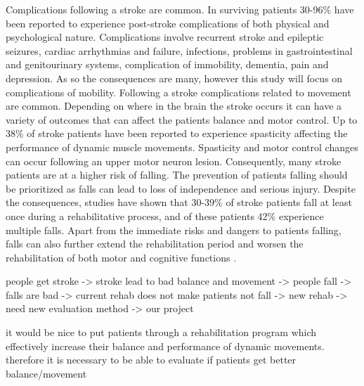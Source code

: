 Complications following a stroke are common. In surviving patients 30-96\% have been reported to experience post-stroke complications of both physical and psychological nature. Complications involve recurrent stroke and epileptic seizures, cardiac arrhythmias and failure, infections, problems in gastrointestinal and genitourinary systems, complication of immobility, dementia, pain and depression.  \cite{Bhalla2016} %
As so the consequences are many, however this study will focus on complications of mobility. Following a stroke complications related to movement are common. Depending on where in the brain the stroke occurs it can have a variety of outcomes that can affect the patients balance and motor control. Up to 38\% of stroke patients have been reported to experience spasticity affecting the performance of dynamic muscle movements. Spasticity and motor control changes can occur following an upper motor neuron lesion. \cite{Bhalla2016} %
Consequently, many stroke patients are at a higher risk of falling. %
The prevention of patients falling should be prioritized as falls can lead to loss of independence and serious injury. Despite the consequences, studies have shown that 30-39\% of stroke patients fall at least once during a rehabilitative process, and of these patients 42\% experience multiple falls. \cite{Bhalla2016, Hanger2014} Apart from the immediate risks and dangers to patients falling, falls can also further extend the rehabilitation period and worsen the rehabilitation of both motor and cognitive functions \cite{Wong2016, Blennerhassett2012}. 


people get stroke -> stroke lead to bad balance and movement -> people fall -> falls are bad -> current rehab does not make patients not fall -> new rehab -> need new evaluation method -> our project

it would be nice to put patients through a rehabilitation program which effectively increase their balance and performance of dynamic movements. therefore it is necessary to be able to evaluate if patients get better balance/movement





